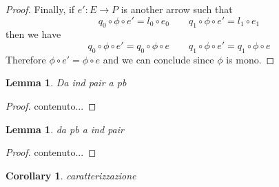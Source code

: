 \documentclass[a4paper,twoside]{report}
\def\Set{\textbf {\textup{Set}}}
\newtheorem{lemma}[theorem]{Lemma}
\newtheorem{corollary}[theorem]{Corollary}
\theoremstyle{definition}
\newtheorem{definition}[theorem]{Definition}
\begin{document}
\begin{proof}
Finally, if $e'\colon E \to P$ is another arrow such that 		
\[q_0\circ \phi\circ e'=l_0\circ e_0 \qquad q_1\circ \phi\circ e'=l_1\circ e_1\]
then we have 
\[q_0\circ \phi\circ e'=q_0\circ \phi\circ e \qquad q_1\circ \phi\circ e'=q_1\circ \phi\circ e\]
Therefore $\phi\circ e'=\phi \circ e$ and we can conclude since $\phi$ is mono.
	\end{proof}


\begin{lemma}
	Da ind pair a pb
\end{lemma}

\begin{proof}
	contenuto...
\end{proof}

\begin{lemma}
	da pb a ind pair
\end{lemma}
\begin{proof}
	contenuto...
\end{proof}

\begin{corollary}
	caratterizzazione
\end{corollary}
\fi 






\appendix










\iffalse 

\section{Rewriting systems on $\Set$.}\label{app:set}

\section{On permutations}\label{app:perm}
\todo{inserire risutati sulle permutazione che abbiamo usato}


\begin{definition}
	\todo{inversioni}
\end{definition}

\todo{anche grafi con equivalenza}
\fi 
\end{document}
